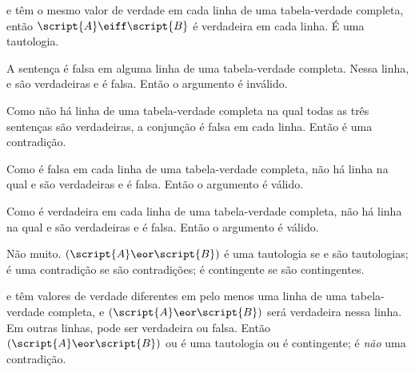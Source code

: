\begin{earg}
\item %
 e  têm o mesmo valor de verdade em cada linha de uma tabela-verdade completa, então $\script{A}\eiff\script{B}$ é verdadeira em cada linha. É uma tautologia.
\item %
A sentença é falsa em alguma linha de uma tabela-verdade completa. Nessa linha,  e  são verdadeiras e  é falsa. Então o argumento é inválido.
\item %
Como não há linha de uma tabela-verdade completa na qual todas as três sentenças são verdadeiras, a conjunção é falsa em cada linha. Então é uma contradição.
\item %
Como  é falsa em cada linha de uma tabela-verdade completa, não há linha na qual  e  são verdadeiras e  é falsa. Então o argumento é válido.
\item %
Como  é verdadeira em cada linha de uma tabela-verdade completa, não há linha na qual  e  são verdadeiras e  é falsa. Então o argumento é válido.
\item %
Não muito. $(\script{A}\eor\script{B})$ é uma tautologia se  e  são tautologias; é uma contradição se são contradições; é contingente se são contingentes.
\item %
 e  têm valores de verdade diferentes em pelo menos uma linha de uma tabela-verdade completa, e $(\script{A}\eor\script{B})$ será verdadeira nessa linha. Em outras linhas, pode ser verdadeira ou falsa. Então $(\script{A}\eor\script{B})$ ou é uma tautologia ou é contingente; é \emph{não} uma contradição.
\end{earg}



